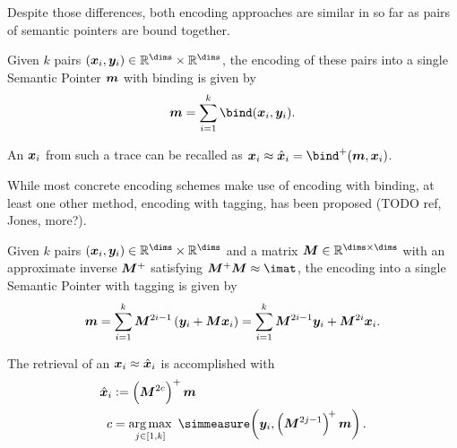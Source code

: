 Despite those differences, both encoding approaches are similar in so far as pairs of semantic pointers are bound together.
\begin{defn}
    Given $k$ pairs $(\vc x_i, \vc y_i) \in \mathbb{R}^{\dims} \times \mathbb{R}^{\dims}$, the encoding of these pairs into a single Semantic Pointer $\bm{m}$ with binding is given by
    \begin{equation}
        \vc m = \sum_{i=1}^k \bind(\vc x_i, \vc y_i) \text{.}
    \end{equation}
\end{defn}
An $\bm{x}_i$ from such a trace can be recalled as $\vc x_i \approx \hat{\vc x}_i = \bind^+(\vc m, \vc x_i)$.

While most concrete encoding schemes make use of encoding with binding, at least one other method, encoding with tagging, has been proposed (TODO ref, Jones, more?).
\begin{defn}
    Given $k$ pairs $(\vc x_i, \vc y_i) \in \mathbb{R}^{\dims} \times \mathbb{R}^{\dims}$ and a matrix $\mat M \in \mathbb{R}^{\dims \times \dims}$ with an approximate inverse $\bm{M}^+$ satisfying $\mat M^+ \mat M \approx \imat$, the encoding into a single Semantic Pointer with tagging is given by
    \begin{equation}
        \vc m = \sum_{i=1}^k \mat M^{2i-1} \del{\vc y_i + \mat M \vc x_i} = \sum_{i=1}^k \mat M^{2i-1} \vc y_i + \mat M^{2i} \vc x_i \text{.}
    \end{equation}
\end{defn}
The retrieval of an $\bm{x}_i \approx \hat{\bm{x}}_i$ is accomplished with
\begin{align}
    \hat{\vc x}_i &:= \del{\mat M^{2c}}^+ \vc m \\
    c &= \argmax_{j \in \sbr{1, k}}\ \simmeasure\!\del{\vc y_i, \del{\mat M^{2j-1}}^{\!+} \vc m} \text{.}
\end{align}

